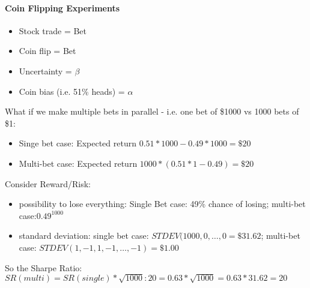 \documentclass{scrartcl}
\begin{document}
\paragraph{Coin Flipping Experiments}
\begin{itemize}
\item Stock trade = Bet
\item Coin flip = Bet
\item Uncertainty = $\beta$
\item Coin bias (i.e. 51\% heads) = $\alpha$
\end{itemize}
What if we make multiple bets in parallel - i.e. one bet of \$1000 vs 1000 bets
of \$1:
\begin{itemize}
\item Singe bet case: Expected return $0.51 * 1000 - 0.49 * 1000 = \$20$
\item Multi-bet case: Expected return $1000 * (0.51 * 1 - 0.49) = \$20$
\end{itemize}
Consider Reward/Risk: 
\begin{itemize}
\item possibility to lose everything: Single Bet case: 49\% chance of losing;
  multi-bet case:$0.49^{1000}$
\item standard deviation: single bet case: $STDEV(1000, 0, \dots, 0 = \$31.62$;
  multi-bet case: $STDEV(1, -1, 1, -1, \dots, -1) = \$1.00$
\end{itemize}
So the Sharpe Ratio:\\
$SR(multi) = SR(single) * \sqrt{1000}: 20 = 0.63 * \sqrt{1000} = 0.63*31.62 =
20$\\
\end{document}
